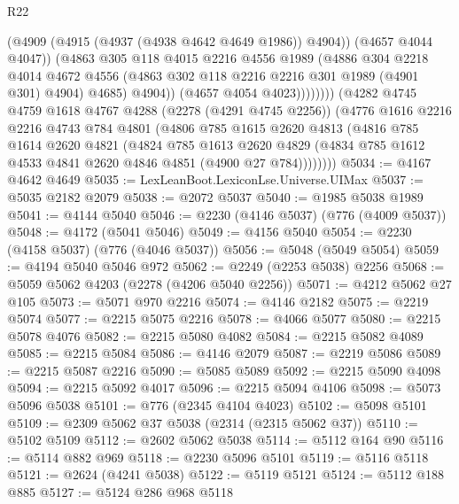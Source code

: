 \begin{lexlean}{R22}
\begin{coremodule}
                        (@4909 (@4915 (@4937 (@4938 @4642 @4649 @1986)) @4904))
                        (@4657 @4044 @4047))
                      (@4863
                        @305
                        @118
                        @4015
                        @2216
                        @4556
                        @1989
                        (@4886
                          @304
                          @2218
                          @4014
                          @4672
                          @4556
                          (@4863 @302 @118 @2216 @2216 @301 @1989 (@4901 @301) @4904)
                          @4685)
                        @4904))
                    (@4657 @4054 @4023))))))))
      (@4282
        @4745
        @4759
        @1618
        @4767
        @4288
        (@2278 (@4291 @4745 @2256))
        (@4776
          @1616
          @2216
          @2216
          @4743
          @784
          @4801
          (@4806
            @785
            @1615
            @2620
            @4813
            (@4816
              @785
              @1614
              @2620
              @4821
              (@4824
                @785
                @1613
                @2620
                @4829
                (@4834 @785 @1612 @4533 @4841 @2620 @4846 @4851 (@4900 @27 @784))))))))
@5034 := @4167 @4642 @4649
@5035 := LexLeanBoot.LexiconLse.Universe.UIMax
@5037 := @5035 @2182 @2079
@5038 := @2072 @5037
@5040 := @1985 @5038 @1989
@5041 := @4144 @5040
@5046 := @2230 (@4146 @5037) (@776 (@4009 @5037))
@5048 := @4172 (@5041 @5046)
@5049 := @4156 @5040
@5054 := @2230 (@4158 @5037) (@776 (@4046 @5037))
@5056 := @5048 (@5049 @5054)
@5059 := @4194 @5040 @5046 @972
@5062 := @2249 (@2253 @5038) @2256
@5068 := @5059 @5062 @4203 (@2278 (@4206 @5040 @2256))
@5071 := @4212 @5062 @27 @105
@5073 := @5071 @970 @2216
@5074 := @4146 @2182
@5075 := @2219 @5074
@5077 := @2215 @5075 @2216
@5078 := @4066 @5077
@5080 := @2215 @5078 @4076
@5082 := @2215 @5080 @4082
@5084 := @2215 @5082 @4089
@5085 := @2215 @5084
@5086 := @4146 @2079
@5087 := @2219 @5086
@5089 := @2215 @5087 @2216
@5090 := @5085 @5089
@5092 := @2215 @5090 @4098
@5094 := @2215 @5092 @4017
@5096 := @2215 @5094 @4106
@5098 := @5073 @5096 @5038
@5101 := @776 (@2345 @4104 @4023)
@5102 := @5098 @5101
@5109 := @2309 @5062 @37 @5038 (@2314 (@2315 @5062 @37))
@5110 := @5102 @5109
@5112 := @2602 @5062 @5038
@5114 := @5112 @164 @90
@5116 := @5114 @882 @969
@5118 := @2230 @5096 @5101
@5119 := @5116 @5118
@5121 := @2624 (@4241 @5038)
@5122 := @5119 @5121
@5124 := @5112 @188 @885
@5127 := @5124 @286 @968 @5118

\end{coremodule}
\end{lexlean}
